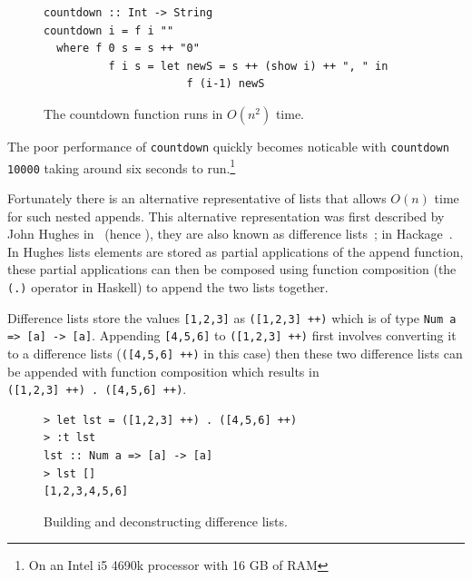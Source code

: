 \begin{figure}[t]
\DIFdelbeginFL %
\DIFdelendFL \DIFaddbeginFL \begin{lstlisting}
countdown :: Int -> String
countdown i = f i ""
  where f 0 s = s ++ "0"
          f i s = let newS = s ++ (show i) ++ ", " in
                      f (i-1) newS
\end{lstlisting}
\DIFaddendFL \caption{The countdown function runs in $O(n^2)$ time.}
\label{countdown}
\end{figure}

The poor performance of \texttt{countdown} quickly becomes noticable with \texttt{countdown 10000} taking around six seconds to run.\footnote{On an Intel i5 4690k processor with 16 GB of RAM}

Fortunately there is an alternative representative of lists that allows $O(n)$ time for such nested appends. This alternative representation was first described by John Hughes in~\citep{hughesList} (hence \DIFdelbegin {}\DIFdelend \DIFaddbegin {}\DIFaddend ), they are also known as difference lists~\citep{realWorldHaskell}; \DIFdelbegin {}\DIFdelend \DIFaddbegin {}\DIFaddend in Hackage~\citep{dlist}. In Hughes lists elements are stored as partial applications of the append function, these partial applications can then be composed \DIFdelbegin {}\DIFdelend using function composition (the \texttt{(.)} operator in Haskell) to append the two lists together. 

Difference lists store the values \texttt{[1,2,3]} as \texttt{([1,2,3] ++)} which is of type \texttt{Num a => [a] -> [a]}. Appending \texttt{[4,5,6]} to \texttt{([1,2,3] ++)} first involves converting it to a difference lists (\texttt{([4,5,6] ++)} in this case) then these two difference lists can be appended with function composition which results in\DIFaddbegin \DIFadd{: }\\ \DIFaddend \texttt{([1,2,3] ++) . ([4,5,6] ++)}. 

\begin{figure}[t]
\begin{lstlisting}
> let lst = ([1,2,3] ++) . ([4,5,6] ++)
> :t lst
lst :: Num a => [a] -> [a]
> lst []
[1,2,3,4,5,6]
\end{lstlisting}
\caption{Building and deconstructing difference lists.}
\label{ghciDList}
\end{figure}

